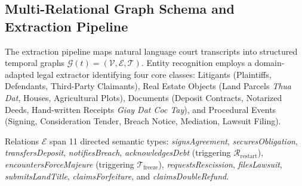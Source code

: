 \documentclass[11pt,a4paper]{article}
\begin{document}
\begin{table}[!ht]
\centering
\caption{Geographic and Jurisdictional Macro-Region Distribution of SynapseCivil-Bench.}
\label{tab:geographic_distribution}
\small
{}
\end{table}

\subsection{Multi-Relational Graph Schema and Extraction Pipeline}
The extraction pipeline maps natural language court transcripts into structured temporal graphs $\mathcal{G}(t) = (\mathcal{V}, \mathcal{E}, \mathcal{T})$. Entity recognition employs a domain-adapted legal extractor identifying four core classes: Litigants (Plaintiffs, Defendants, Third-Party Claimants), Real Estate Objects (Land Parcels \textit{Thua Dat}, Houses, Agricultural Plots), Documents (Deposit Contracts, Notarized Deeds, Hand-written Receipts \textit{Giay Dat Coc Tay}), and Procedural Events (Signing, Consideration Tender, Breach Notice, Mediation, Lawsuit Filing).

Relations $\mathcal{E}$ span 11 directed semantic types: \textit{signsAgreement}, \textit{securesObligation}, \textit{transfersDeposit}, \textit{notifiesBreach}, \textit{acknowledgesDebt} (triggering $\mathcal{R}_{\text{restart}}$), \textit{encountersForceMajeure} (triggering $\mathcal{T}_{\text{freeze}}$), \textit{requestsRescission}, \textit{filesLawsuit}, \textit{submitsLandTitle}, \textit{claimsForfeiture}, and \textit{claimsDoubleRefund}.
\end{document}
